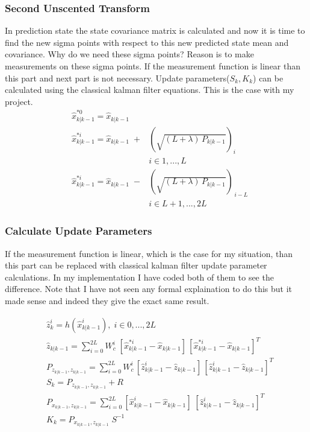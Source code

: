 \documentclass[peerreview]{IEEEtran}
\begin{document}
\subsubsection{Second Unscented Transform}
In prediction state the state covariance matrix is calculated and now it is time to find the new sigma points with respect to this new predicted state mean and covariance. Why do we need these sigma points? Reason is to make measurements on these sigma points. If the measurement function is linear than this part and next part is not necessary. Update parameters($S_k, K_k$) can be calculated using the classical kalman filter equations. This is the case with my project.
\vspace{10px}
\begin{equation}
\begin{aligned}
&\hat{x}_{k|k-1}^{*0} = \hat{x}_{k|k-1} \\
&\hat{x}_{k|k-1}^{*i} = \hat{x}_{k|k-1} \; + &(\sqrt{(L+\lambda) \, P_{k|k-1}})_i  \\
& &i\in 1,...,L\\
&\hat{x}_{k|k-1}^{*i} = \hat{x}_{k|k-1} \; - &(\sqrt{(L+\lambda) \, P_{k|k-1}})_{\,i-L} \\
& &i\in L+1,...,2L 
\end{aligned}
\end{equation}
\vspace{10px}
\subsubsection{Calculate Update Parameters}
If the measurement function is linear, which is the case for my situation, than this part can be replaced with classical kalman filter update parameter calculations. In my implementation I have coded both of them to see the difference. Note that I have not seen any formal explaination to do this but it made sense and indeed they give the exact same result.
\vspace{10px}

\begin{equation}
\begin{aligned}
&\hat{z}_k^i = h(\hat{x}_{k|k-1}^i), \; i\in 0,...,2L\\
&\hat{z}_{k|k-1} = \sum\limits_{i=0}^{2L} W_c^i \; [\hat{x}_{k|k-1}^{*i} - \hat{x}_{k|k-1}]\,[\hat{x}_{k|k-1}^{*i} - \hat{x}_{k|k-1}]^T\\
&P_{z_{k|k-1}, z_{k|k-1}} = \sum\limits_{i=0}^{2L} W_c^i \, [\hat{z}_{k|k-1}^i - \hat{z}_{k|k-1}]\,[\hat{z}_{k|k-1}^i - \hat{z}_{k|k-1}]^T \\
&S_k = P_{z_{k|k-1}, z_{k|k-1}} + R\\
&P_{x_{k|k-1}, z_{k|k-1}} = \sum\limits_{i=0}^{2L} [\hat{x}_{k|k-1}^i - \hat{x}_{k|k-1}]\;[\hat{z}_{k|k-1}^i - \hat{z}_{k|k-1}]^T\\
&K_k = P_{x_{k|k-1},z_{k|k-1}} \; S^{-1}
\end{aligned}
\end{equation}
\end{document}
